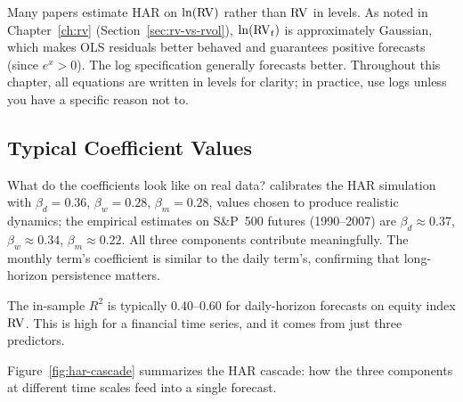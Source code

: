 \begin{warning}
Many papers estimate HAR on $\ln(\operatorname{RV})$ rather than $\operatorname{RV}$ in levels.
As noted in Chapter~\ref{ch:rv} (Section~\ref{sec:rv-vs-rvol}), $\ln(\operatorname{RV}_t)$ is approximately Gaussian, which makes OLS residuals better behaved and guarantees positive forecasts (since $e^x > 0$).
The log specification generally forecasts better.
Throughout this chapter, all equations are written in levels for clarity; in practice, use logs unless you have a specific reason not to.
\end{warning}

\subsection{Typical Coefficient Values}

What do the coefficients look like on real data?
\citet{Corsi2009} calibrates the HAR simulation with $\beta_d = 0.36$, $\beta_w = 0.28$, $\beta_m = 0.28$, values chosen to produce realistic dynamics; the empirical estimates on S\&P~500 futures (1990--2007) are $\beta_d \approx 0.37$, $\beta_w \approx 0.34$, $\beta_m \approx 0.22$.
All three components contribute meaningfully.
The monthly term's coefficient is similar to the daily term's, confirming that long-horizon persistence matters.

The in-sample $R^2$ is typically 0.40--0.60 for daily-horizon forecasts on equity index $\operatorname{RV}$.
This is high for a financial time series, and it comes from just three predictors.

Figure~\ref{fig:har-cascade} summarizes the HAR cascade: how the three components at different time scales feed into a single forecast.

